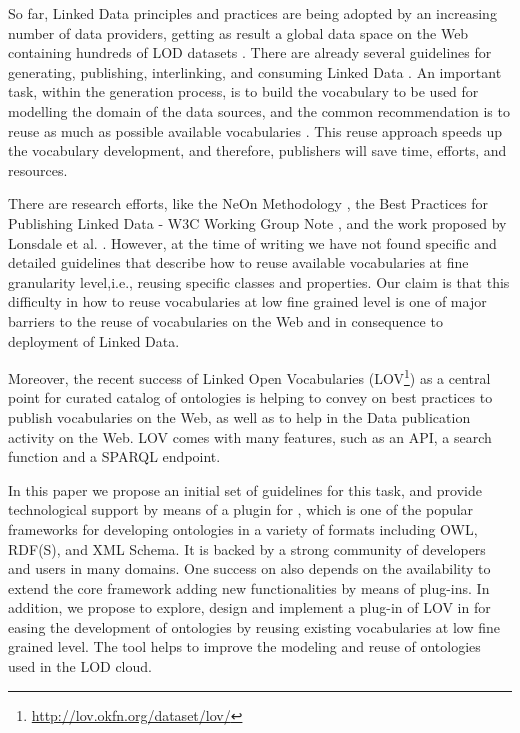 
So far, Linked Data principles and practices are being adopted by an increasing number of data providers, getting as result a global data space on the Web containing hundreds of LOD datasets \cite{Heath_Bizer_2011}. There are already several guidelines for generating, publishing, interlinking, and consuming Linked Data \cite{Heath_Bizer_2011}. An important task, within the generation process, is to build the vocabulary to be used for modelling the domain of the data sources, and the common recommendation is to reuse as much as possible available vocabularies \cite{Heath_Bizer_2011,hyland14}. This reuse approach speeds up the vocabulary development, and therefore, publishers will save time, efforts, and resources. 

There are research efforts, like the NeOn Methodology \cite{suarezfigueroa2012ontology}, the Best Practices for Publishing Linked Data - W3C Working Group Note \cite{hyland14}, and the work proposed by Lonsdale et al. \cite{Lonsdale2010318}. However, at the time of writing we have not found specific and detailed guidelines that describe how to reuse available vocabularies at fine granularity level,i.e., reusing specific classes and properties. Our claim is that this difficulty in how to reuse vocabularies at low fine grained level is one of major barriers to the reuse of vocabularies on the Web and in consequence to deployment of Linked Data.


Moreover, the recent success of Linked Open Vocabularies (LOV\footnote{\url{http://lov.okfn.org/dataset/lov/}}) as a central point for curated catalog of ontologies is helping to convey on best practices to publish vocabularies on the Web, as well as to help in the Data publication activity on the Web. LOV comes with many features, such as an API, a search function and a SPARQL endpoint.

In this paper we propose an initial set of guidelines for this task, and provide technological support by means of a plugin for \protege, which is one of the popular frameworks for developing ontologies in a variety of formats including OWL, RDF(S), and XML Schema. It is backed by a strong community of developers and users in many domains. One success on \protege also depends on the availability to extend the core framework adding new functionalities by means of plug-ins. In addition, we propose to explore, design and implement a plug-in of LOV in \protege for easing the development of ontologies by reusing existing vocabularies at low fine grained level. The tool helps to improve the modeling and reuse of ontologies used in the LOD cloud.

